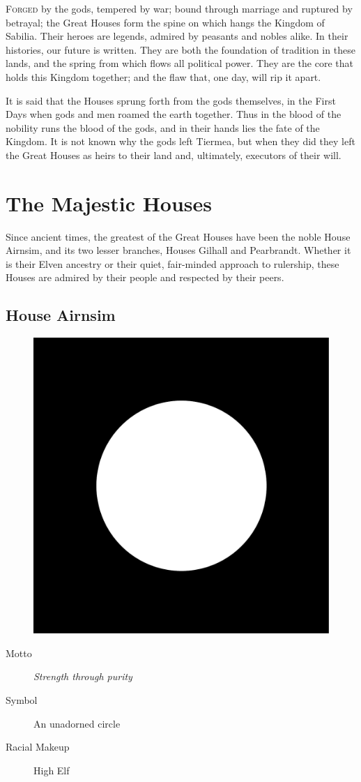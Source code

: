 \documentclass[10pt,twoside,openright,a4paper,twocolumn]{book}
\begin{document}
\lettrine{F}{orged} by the gods, tempered by war; bound through marriage and
ruptured by betrayal; the Great Houses form the spine on which hangs the Kingdom
of Sabilia.
Their heroes are legends, admired by peasants and nobles alike.  In their histories,
our future is written.  They are both the foundation of tradition in these lands,
and the spring from which flows all political power.  They are the core that holds
this Kingdom together; and the flaw that, one day, will rip it apart.

It is said that the Houses sprung forth from the gods themselves, in the First
Days when gods and men roamed the earth together.  Thus in the blood of the
nobility runs the blood of the gods, and in their hands lies the fate of the
Kingdom.  It is not known why the gods left Tiermea, but when they did they
left the Great Houses as heirs to their land and, ultimately, executors of
their will.

\section{The Majestic Houses}

Since ancient times, the greatest of the Great Houses have been the noble House
Airnsim, and its two lesser branches, Houses Gilhall and Pearbrandt.  Whether
it is their Elven ancestry or their quiet, fair-minded approach to rulership,
these Houses are admired by their people and respected by their peers.

\subsection*{House Airnsim}

\begin{figure}
  \includegraphics[width=0.38\columnwidth]{images/HouseAirnsim}
\end{figure}

\begin{description}
\item[Motto] \textit{Strength through purity}

\item[Symbol] An unadorned circle

\item[Racial Makeup] High Elf
\end{description}
\end{document}
